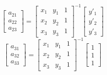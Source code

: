 \[
  \begin{bmatrix}
    a_{21}\\
    a_{22}\\
    a_{23}
  \end{bmatrix} =
  \begin{bmatrix}
    x_1 & y_1 & 1\\
    x_2 & y_2 & 1\\
    x_3 & y_3 & 1
  \end{bmatrix}^{-1}
  \begin{bmatrix}
    y'_1\\
    y'_2\\
    y'_3
  \end{bmatrix}
\]
\[
  \begin{bmatrix}
    a_{31}\\
    a_{32}\\
    a_{33}
  \end{bmatrix} =
  \begin{bmatrix}
    x_1 & y_1 & 1\\
    x_2 & y_2 & 1\\
    x_3 & y_3 & 1
  \end{bmatrix}^{-1}
  \begin{bmatrix}
    1\\
    1\\
    1
  \end{bmatrix}
\]

